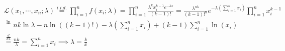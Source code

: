 \begin{gather*}
    \mathcal{L} (x_1, \cdots, x_n; \lambda) \stackrel{i.i.d.}{=} \prod_{i=1}^n f(x_i; \lambda)
    = \prod_{i=1}^n \frac{\lambda^k x_i^{k-1} e^{-\lambda x}}{(k-1)!} = \frac{\lambda^{nk}}{(k-1)!^n} e^{-\lambda (\sum_{i=1}^n x_i)} \prod_{i=1}^n x_i^{k-1}\\
    \stackrel{\ln}{=} nk \ln \lambda - n\ln((k-1)!) -\lambda (\sum_{i=1}^n x_i) + (k-1) \sum_{i=1}^n \ln(x_i)\\
    \stackrel{\frac{d}{d \lambda}}{=} \frac{nk}{\lambda} = \sum_{i=1}^n x_i
    \implies \lambda = \frac{k}{\overline{x}}
\end{gather*}